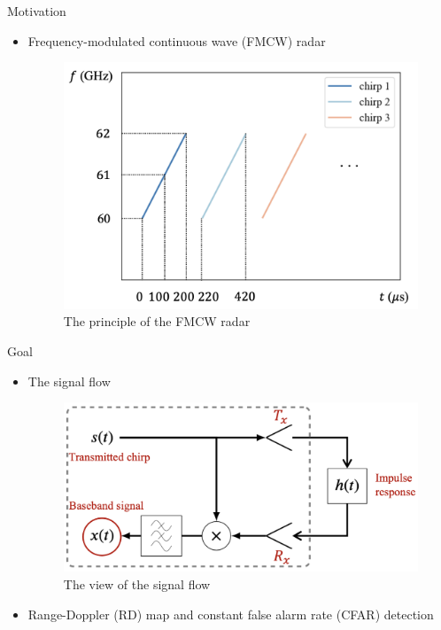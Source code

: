 \documentclass{beamer}
\begin{document}
\begin{frame}[t]{Motivation}
	\begin{itemize}
	    \item Frequency-modulated continuous wave (FMCW) radar
        \vspace{0.5\baselineskip}
            \begin{figure}
            	\centering
            	\includegraphics[scale=.3]{figures/FMCW_principle.png}
            	\caption{The principle of the FMCW radar}
            \end{figure}
	\end{itemize}
\end{frame}



\begin{frame}[t]{Goal}
	\begin{itemize}
	    \item The signal flow
            \begin{figure}
            	\centering
            	\includegraphics[scale=.3]{figures/signal_flow_pre.png}
            	\caption{The view of the signal flow \cite{hafner_parameter_2021}}
            \end{figure}
        \item Range-Doppler (RD) map and constant false alarm rate (CFAR) detection
	\end{itemize}
\end{frame}
\end{document}
